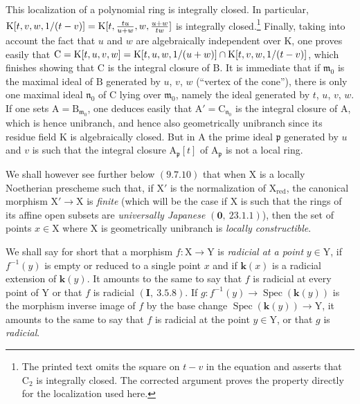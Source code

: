 This localization of a polynomial ring is integrally closed. In particular,
$\mathrm{K}[t,v,w,1/(t- v)]=\mathrm{K}[t,\frac{tu}{u+w},w,\frac{u+w}{tw}]$ is integrally closed.\footnote{The printed text omits the square on $t-v$ in the equation and asserts that $\mathrm{C}_2$ is integrally closed. The corrected argument proves the property directly for the localization used here.}
Finally, taking into
account the fact that $u$ and $w$ are algebraically independent over $\mathrm{K}$, one proves easily
that $\mathrm{C}=\mathrm{K}[t,u,v,w]=\mathrm{K}[t,u,w,1/(u+w)]\cap\mathrm{K}[t,v,w,1/(t- v)]$, which finishes
showing that $\mathrm{C}$ is the integral closure of $\mathrm{B}$. It is immediate that if $\mathfrak{m}_0$ is the maximal ideal
of $\mathrm{B}$ generated by $u$, $v$, $w$ (``vertex of the cone''), there is only one maximal
ideal $\mathfrak{n}_0$ of $\mathrm{C}$ lying over $\mathfrak{m}_0$, namely the ideal generated by $t$, $u$, $v$, $w$. If one sets $\mathrm{A}=\mathrm{B}_{\mathfrak{m}_0}$, one deduces
easily that $\mathrm{A}'=\mathrm{C}_{\mathfrak{n}_0}$ is the integral closure of $\mathrm{A}$, which is hence unibranch, and hence
also geometrically unibranch since its residue field $\mathrm{K}$ is algebraically closed.
But in $\mathrm{A}$ the prime ideal $\mathfrak{p}$ generated by $u$ and $v$ is such that the integral
closure $\mathrm{A}_\mathfrak{p}[t]$ of $\mathrm{A}_\mathfrak{p}$ is not a local ring.

We shall however see further below $(9.7.10)$ that when $\mathrm{X}$ is a locally Noetherian prescheme
such that, if $\mathrm{X}'$ is the normalization of $\mathrm{X}_{\mathrm{red}}$, the canonical morphism $\mathrm{X}'\to\mathrm{X}$
is \emph{finite} (which will be the case if $\mathrm{X}$ is such that the rings of its affine open subsets are
\emph{universally Japanese} $(\mathbf{0},~23.1.1)$), then the set of points $x\in\mathrm{X}$ where $\mathrm{X}$ is geometrically
unibranch is \emph{locally constructible}.

\begin{env}[6.15.3]
\label{IV.6.15.3}
We shall say for short that a morphism $f:\mathrm{X}\to\mathrm{Y}$ is \emph{radicial at a
point} $y\in\mathrm{Y}$, if $f^{-1}(y)$ is empty or reduced to a single point $x$ and if $\boldsymbol{k}(x)$ is a radicial extension
of $\boldsymbol{k}(y)$. It amounts to the same to say that $f$ is radicial at every point of $\mathrm{Y}$
or that $f$ is radicial $(\mathbf{I},~3.5.8)$. If $g:f^{-1}(y)\to\operatorname{Spec}(\boldsymbol{k}(y))$ is the morphism inverse
image of $f$ by the base change $\operatorname{Spec}(\boldsymbol{k}(y))\to\mathrm{Y}$, it amounts to the same to say that $f$
is radicial at the point $y\in\mathrm{Y}$, or that $g$ is \emph{radicial}.
\end{env}

